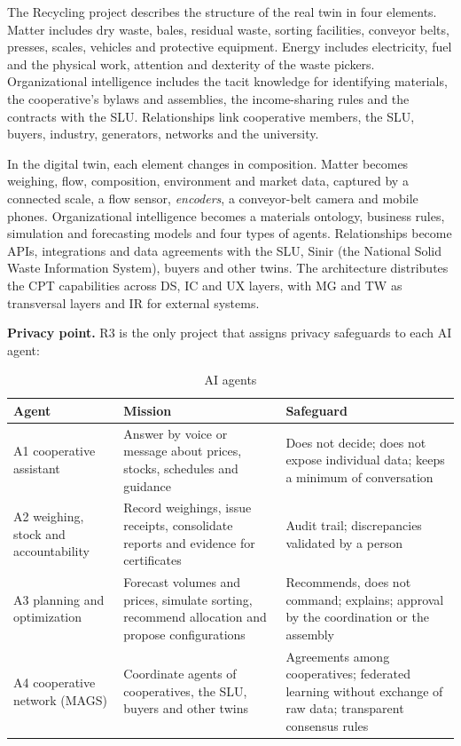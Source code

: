 \documentclass[12pt,a4paper,article,oneside,brazil,english]{abntex2}
\newcommand{\fontetab}[1]{\par\vspace{3pt}{\small\noindent Source: #1\par}}
\begin{document}
The Recycling project describes the structure of the real twin in four elements. Matter includes dry waste, bales, residual waste, sorting facilities, conveyor belts, presses, scales, vehicles and protective equipment. Energy includes electricity, fuel and the physical work, attention and dexterity of the waste pickers. Organizational intelligence includes the tacit knowledge for identifying materials, the cooperative's bylaws and assemblies, the income-sharing rules and the contracts with the SLU. Relationships link cooperative members, the SLU, buyers, industry, generators, networks and the university.

In the digital twin, each element changes in composition. Matter becomes weighing, flow, composition, environment and market data, captured by a connected scale, a flow sensor, \textit{encoders}, a conveyor-belt camera and mobile phones. Organizational intelligence becomes a materials ontology, business rules, simulation and forecasting models and four types of agents. Relationships become APIs, integrations and data agreements with the SLU, Sinir (the National Solid Waste Information System), buyers and other twins. The architecture distributes the CPT capabilities across DS, IC and UX layers, with MG and TW as transversal layers and IR for external systems.

\textbf{Privacy point.} R3 is the only project that assigns privacy safeguards to each AI agent:

\begin{table}[!htbp]
\centering
\caption{AI agents}
\label{tab:agentes}
\small
\begin{tabularx}{\linewidth}{>{\raggedright\arraybackslash}p{3.4cm} Y Y}
\hline
\textbf{Agent} & \textbf{Mission} & \textbf{Safeguard}\\
\hline
A1 cooperative assistant & Answer by voice or message about prices, stocks, schedules and guidance & Does not decide; does not expose individual data; keeps a minimum of conversation\\
A2 weighing, stock and accountability & Record weighings, issue receipts, consolidate reports and evidence for certificates & Audit trail; discrepancies validated by a person\\
A3 planning and optimization & Forecast volumes and prices, simulate sorting, recommend allocation and propose configurations & Recommends, does not command; explains; approval by the coordination or the assembly\\
A4 cooperative network (MAGS) & Coordinate agents of cooperatives, the SLU, buyers and other twins & Agreements among cooperatives; federated learning without exchange of raw data; transparent consensus rules\\
\hline
\end{tabularx}
\fontetab{Prepared by the author (2026).}
\end{table}
\end{document}

